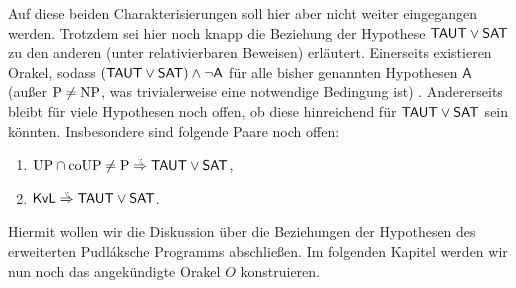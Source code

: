 \begin{itemize}[parsep=0pt,listparindent=\parindent,itemsep=5pt plus 1pt minus 1pt,midpenalty=0]
        Auf diese beiden Charakterisierungen soll hier aber nicht weiter eingegangen werden.
        Trotzdem sei hier noch knapp die Beziehung der Hypothese $\mathsf{TAUT}\lor\mathsf{SAT}$ zu den anderen (unter relativierbaren Beweisen) erläutert.
        Einerseits existieren Orakel, sodass $(\mathsf{TAUT}\lor\mathsf{SAT})\land \neg\mathsf{A}$ für alle bisher genannten Hypothesen $\mathsf A$ (außer $\mathrm{P}\neq\mathrm{NP}$, was trivialerweise eine notwendige Bedingung ist) . Andererseits bleibt für viele Hypothesen noch offen, ob diese hinreichend für $\mathsf{TAUT}\lor\mathsf{SAT}$ sein könnten. Insbesondere sind folgende Paare noch offen:
        \begin{enumerate}[noitemsep,resume,label=(\roman*)]
            \item $\UP\cap\coUP\neq \P\stackrel{\smash{\text{\raisebox{-1pt}{\tiny ?}}}}{\Rightarrow}\hTAUT\lor\hSAT$,
            \item $\mathsf{KvL}\stackrel{\smash{\text{\raisebox{-1pt}{\tiny ?}}}}{\Rightarrow}\hTAUT\lor\hSAT$.
        \end{enumerate}
\end{itemize}

Hiermit wollen wir die Diskussion über die Beziehungen der Hypothesen des erweiterten Pudláksche Programms abschließen. Im folgenden Kapitel werden wir nun noch das angekündigte Orakel $O$ konstruieren.


